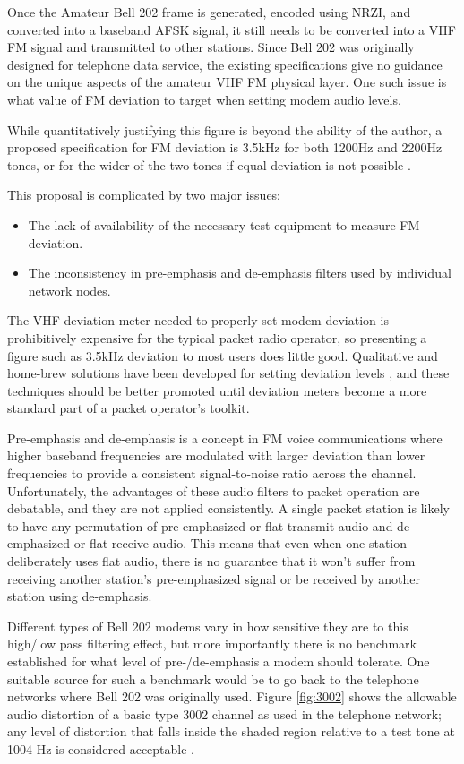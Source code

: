 \documentclass[12pt,letterpaper]{article}
\begin{document}
Once the Amateur Bell 202 frame is generated, encoded using NRZI, and converted into
a baseband AFSK signal, it still needs to be converted into a VHF FM signal
and transmitted to other stations. 
Since Bell 202 was originally designed for telephone data service, 
the existing specifications give no guidance on the unique 
aspects of the amateur VHF FM physical layer. 
One such issue is what value of
FM deviation to target when setting modem audio levels.

While quantitatively justifying this figure is beyond the ability of the
author, a proposed specification for FM deviation is 3.5kHz for both
1200Hz and 2200Hz tones, or for the wider of the two tones if equal
deviation is not possible \cite{millerinterview}.

This proposal is complicated by two major issues: 
\begin{itemize}
	\item The lack of availability of the necessary 
		test equipment to measure FM deviation.
	\item The inconsistency in pre-emphasis and de-emphasis filters
		used by individual network nodes.
\end{itemize}

The VHF deviation meter needed to properly set modem deviation is prohibitively
expensive for the typical packet radio operator, so presenting a figure 
such as 3.5kHz deviation to most users does little good.
Qualitative and home-brew solutions have been developed
for setting deviation levels \cite{n8urdev},
and these techniques should be better promoted until 
deviation meters become a more standard part of a packet operator's toolkit. 

Pre-emphasis and de-emphasis is a concept in FM voice communications where
higher baseband frequencies are modulated with larger deviation 
than lower frequencies
to provide a consistent signal-to-noise ratio across the channel.
Unfortunately, the advantages of these audio filters to packet operation 
are debatable, and they are not applied consistently. A single packet 
station is likely to have any permutation of pre-emphasized or flat 
transmit audio and de-emphasized or flat receive audio.
This means that even when one station deliberately uses flat audio,
there is no guarantee that it won't suffer from receiving another
station's pre-emphasized signal or be received by another station using de-emphasis.

Different types of Bell 202 modems vary in how sensitive they are to this high/low
pass filtering effect, but more importantly there is no benchmark established
for what level of pre-/de-emphasis a modem should tolerate.
One suitable source for such a benchmark would be to go back to the
telephone networks where Bell 202 was originally used.
Figure \ref{fig:3002} shows the allowable audio distortion of a basic type 3002
channel as used in the telephone network; any level of distortion that falls 
inside the shaded region relative to a test tone at 1004 Hz is considered 
acceptable \cite{alisouskas}.
\end{document}

